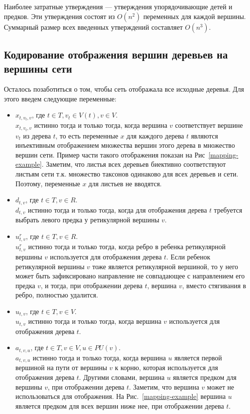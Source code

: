 Наиболее затратные утверждения --- утверждения упорядочивающие детей и предков.
Эти утверждения состоят из $O(n^2)$ переменных для каждой вершины.
Суммарный размер всех введенных утверждений составляет $O(n^3)$.

\FloatBarrier
\subsection{Кодирование отображения вершин деревьев на вершины сети}

Осталось позаботиться о том, чтобы сеть отображала все исходные деревья.
Для этого введем следующие переменные:

\begin{itemize}

\item $x_{t,v_t,v}$, где $t \in T, v_t \in V(t), v \in V$. \\
$x_{t,v_t,v}$ истинно тогда и только тогда, когда вершина $v$ соответствует вершине $v_t$ из дерева $t$, то есть переменные $x$ для каждого дерева $t$ являются инъективным отображением множества вершин этого дерева в множество вершин сети. Пример части такого отображения показан на Рис~\ref{mapping-example}.
Заметим, что листья всех деревьев биективно соответствуют листьям сети т.к. множество таксонов одинаково для всех деревьев и сети.
Поэтому, переменные $x$ для листьев не вводятся.

\item $d_{t,v}$, где $t \in T, v \in R$. \\
$d_{t,v}$ истинно тогда и только тогда, когда для отображения дерева $t$ требуется выбрать левого предка у ретикулярной вершины $v$.

\item $u^r_{t,v}$, где $t \in T, v \in R$. \\
$u^r_{t,v}$ истинно тогда и только тогда, когда ребро в ребенка ретикулярной вершины $v$ используется для отображения дерева $t$.
Если ребенок ретикулярной вершины $v$ тоже является ретикулярной вершиной, то у него может быть зафиксировано направление не совпадающее с направлением его предка $v$, и тогда, при отображении дерева $t$, вершина $v$, вместо стягивания в ребро, полностью удалится.

\item $u_{t,v}$, где $t \in T, v \in V$. \\
$u_{t,v}$ истинно тогда и только тогда, когда вершина $v$ используется для отображения дерева $t$.

\item $a_{t,v,u}$, где $t \in T, v \in V, u \in PU(v)$. \\
$a_{t,v,u}$ истинно тогда и только тогда, когда вершина $u$ является первой вершиной на пути от вершины $v$ к корню, которая используется для отображения дерева $t$.
Другими словами, вершина $u$ является предком для вершины $v$, при отображении дерева $t$.
Заметим, что вершина $v$ может не использоваться для отображения.
На Рис.~\ref{mapping-example} вершина $u$ является предком для всех вершин ниже нее, при отображении дерева $t$.

\end{itemize}

